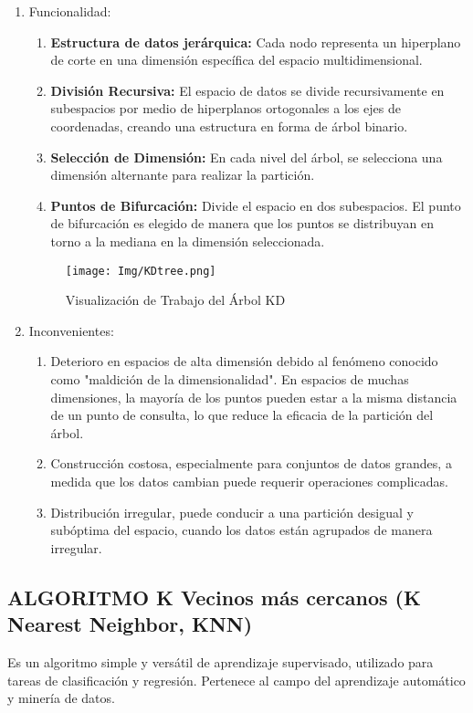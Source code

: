 \documentclass{article}
\begin{document}
\begin{sloppypar}
\begin{enumerate}
    \item Funcionalidad:       
    \begin{enumerate}
       \item \textbf{Estructura de datos jerárquica:} Cada nodo representa un hiperplano de corte en una dimensión específica del espacio multidimensional.     
       \item \textbf{División Recursiva:} El espacio de datos se divide recursivamente en subespacios por medio de hiperplanos ortogonales a los ejes de coordenadas, creando una estructura en forma de árbol binario.
       \item \textbf{Selección de Dimensión: }En cada nivel del árbol, se selecciona una dimensión alternante para realizar la partición.
       \item \textbf{Puntos de Bifurcación: }Divide el espacio en dos subespacios. El punto de bifurcación es elegido de manera que los puntos se distribuyan en torno a la mediana en la dimensión seleccionada.
    \end{enumerate} 
    
    \begin{figure}[H]
    \centering
    \texttt{[image: Img/KDtree.png]}
    \caption{\label{fig:funcionamientoKDtree}Visualización de Trabajo del Árbol KD}
    \end{figure}

    \item Inconvenientes:      
    \begin{enumerate}
       \item  Deterioro en espacios de alta dimensión debido al fenómeno conocido como "maldición de la dimensionalidad". En espacios de muchas dimensiones, la mayoría de los puntos pueden estar a la misma distancia de un punto de consulta, lo que reduce la eficacia de la partición del árbol.
       \item Construcción costosa, especialmente para conjuntos de datos grandes, a medida que los datos cambian puede requerir operaciones complicadas.
       \item Distribución irregular, puede conducir a una partición desigual y subóptima del espacio, cuando los datos están agrupados de manera irregular.
    \end{enumerate} 
\end{enumerate}

\subsection{ALGORITMO K Vecinos más cercanos (K Nearest Neighbor, KNN)} 
Es un algoritmo simple y versátil de aprendizaje supervisado, utilizado para tareas de clasificación y regresión. Pertenece  al campo del aprendizaje automático y minería de datos. \cite{Alpaydin2014IntroML}


\end{sloppypar}
\end{document}
